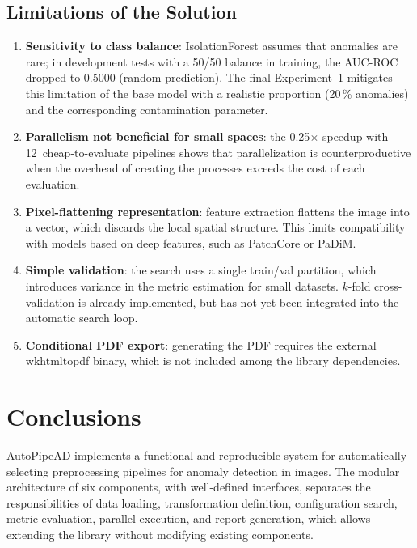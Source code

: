 \documentclass[conference]{IEEEtran}
\begin{document}
\subsection{Limitations of the Solution}

\begin{enumerate}
\item \textbf{Sensitivity to class balance}: IsolationForest assumes that
  anomalies are rare; in development tests with a 50/50 balance in training,
  the AUC-ROC dropped to 0.5000 (random prediction). The final Experiment~1
  mitigates this limitation of the base model with a realistic proportion
  (20\,\% anomalies) and the corresponding contamination parameter.
\item \textbf{Parallelism not beneficial for small spaces}: the 0.25$\times$
  speedup with 12~cheap-to-evaluate pipelines shows that parallelization is
  counterproductive when the overhead of creating the processes exceeds the
  cost of each evaluation.
\item \textbf{Pixel-flattening representation}: feature extraction flattens
  the image into a vector, which discards the local spatial structure. This
  limits compatibility with models based on deep features, such as PatchCore or
  PaDiM.
\item \textbf{Simple validation}: the search uses a single train/val
  partition, which introduces variance in the metric estimation for small
  datasets. $k$-fold cross-validation is already implemented, but has not yet
  been integrated into the automatic search loop.
\item \textbf{Conditional PDF export}: generating the PDF requires the external
  wkhtmltopdf binary, which is not included among the library dependencies.
\end{enumerate}

\section{Conclusions}

AutoPipeAD implements a functional and reproducible system for automatically
selecting preprocessing pipelines for anomaly detection in images. The modular
architecture of six components, with well-defined interfaces, separates the
responsibilities of data loading, transformation definition, configuration
search, metric evaluation, parallel execution, and report generation, which
allows extending the library without modifying existing components.
\end{document}
